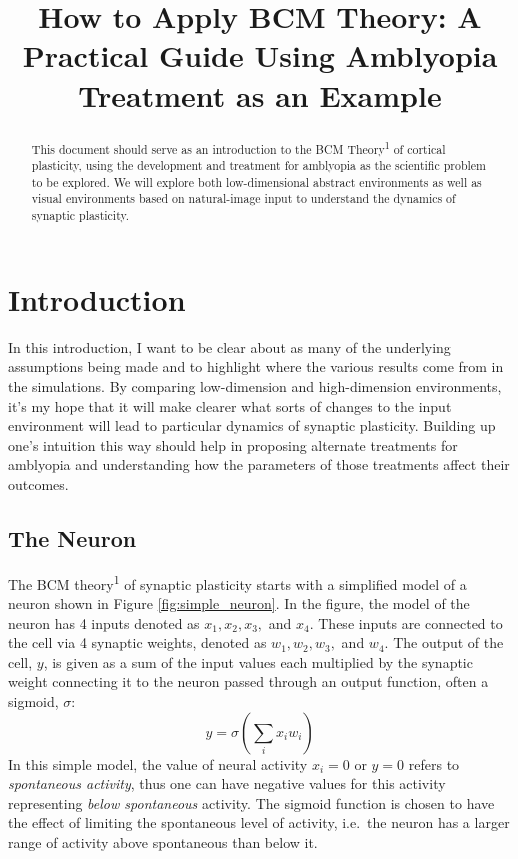 \documentclass[
]{article}
\title{How to Apply BCM Theory: A Practical Guide Using Amblyopia
Treatment as an Example}
\author{}
\date{}
\begin{document}
\maketitle
\begin{abstract}
This document should serve as an introduction to the BCM
Theory\textsuperscript{1} of cortical plasticity, using the development
and treatment for amblyopia as the scientific problem to be explored. We
will explore both low-dimensional abstract environments as well as
visual environments based on natural-image input to understand the
dynamics of synaptic plasticity.
\end{abstract}

{
\hypersetup{linkcolor=}
\setcounter{tocdepth}{3}
\tableofcontents
}
\section{Introduction}\label{sec:introduction}

In this introduction, I want to be clear about as many of the underlying
assumptions being made and to highlight where the various results come
from in the simulations. By comparing low-dimension and high-dimension
environments, it's my hope that it will make clearer what sorts of
changes to the input environment will lead to particular dynamics of
synaptic plasticity. Building up one's intuition this way should help in
proposing alternate treatments for amblyopia and understanding how the
parameters of those treatments affect their outcomes.

\subsection{The Neuron}\label{sec:the-neuron}

The BCM theory\textsuperscript{1} of synaptic plasticity starts with a
simplified model of a neuron shown in Figure \ref{fig:simple_neuron}. In
the figure, the model of the neuron has 4 inputs denoted as
\(x_1, x_2, x_3,\) and \(x_4\). These inputs are connected to the cell
via 4 synaptic weights, denoted as \(w_1, w_2, w_3,\) and \(w_4\). The
output of the cell, \(y\), is given as a sum of the input values each
multiplied by the synaptic weight connecting it to the neuron passed
through an output function, often a sigmoid, \(\sigma\): \[
y=\sigma\left(\sum_i x_i w_i \right)
\] In this simple model, the value of neural activity \(x_i=0\) or
\(y=0\) refers to \emph{spontaneous activity}, thus one can have
negative values for this activity representing \emph{below spontaneous}
activity. The sigmoid function is chosen to have the effect of limiting
the spontaneous level of activity, i.e.~the neuron has a larger range of
activity above spontaneous than below it.
\end{document}
